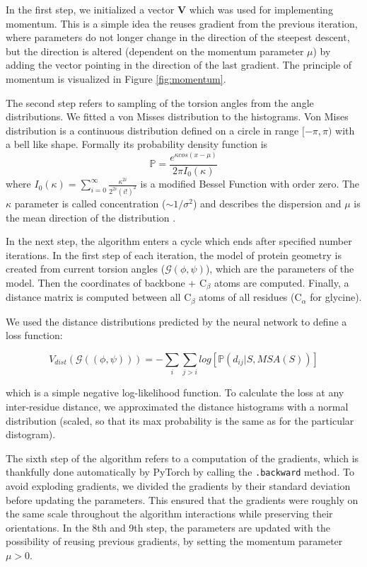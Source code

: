 In the first step, we initialized a vector $\bm{V}$ which was used for implementing momentum. This is a simple idea the reuses gradient from the previous iteration, where parameters do not longer change in the direction of the steepest descent, but the direction is altered (dependent on the momentum parameter $\mu$) by adding the vector pointing in the direction of the last gradient. The principle of momentum is visualized in Figure \ref{fig:momentum}.

The second step refers to sampling of the torsion angles from the angle distributions. We fitted a von Misses distribution to the histograms. Von Mises distribution is a continuous distribution defined on a circle in range $[-\pi, \pi)$ with a bell like shape. Formally its probability density function is 
$$\mathds{P} = \frac{e^{\kappa cos(x - \mu)}}{2\pi I_0(\kappa)}$$ 
where $I_0(\kappa) = \sum_{i=0}^\infty \frac{\kappa^{2i}}{2^{2i}(i!)^2}$ is a modified Bessel Function with order zero. 
The $\kappa$ parameter is called concentration ($\sim 1/\sigma^2$) and describes the dispersion and $\mu$ is the mean direction of the distribution \cite{vonmises}. 

In the next step, the algorithm enters a cycle which ends after specified number iterations. In the first step of each iteration, the model of protein geometry is created from current torsion angles ($\mathcal{G}(\phi, \psi)$), which are the parameters of the model. Then the coordinates of backbone + C$_\beta$ atoms are computed. Finally, a distance matrix is computed between all C$_\beta$ atoms of all residues (C$_\alpha$ for glycine).

We used the distance distributions predicted by the neural network to define a loss function:

\begin{equation}
     V_{dist}(\mathcal{G}((\phi, \psi))) = -\sum_{i} \sum_{j > i} log[\mathds{P} (d_{ij} | S, MSA(S))]
     \label{eq:dist_pot}
\end{equation}

which is a simple negative log-likelihood function. To calculate the loss at any inter-residue distance, we approximated the distance histograms with a normal distribution (scaled, so that its max probability is the same as for the particular distogram).

The sixth step of the algorithm refers to a computation of the gradients, which is thankfully done automatically by PyTorch by calling the \texttt{.backward} method. To avoid exploding gradients, we divided the gradients by their standard deviation before updating the parameters. This ensured that the gradients were roughly on the same scale throughout the algorithm interactions while preserving their orientations. In the 8th and 9th step, the parameters are updated with the possibility of reusing previous gradients, by setting the momentum parameter $\mu > 0$.

